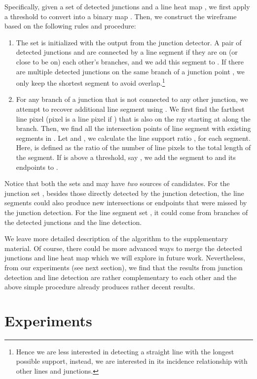 \documentclass[10pt,twocolumn,letterpaper]{article}
\begin{document}
Specifically, given a set of detected junctions  and a line heat map , we first apply a threshold  to convert  into a binary map . Then, we construct the wireframe based on the following rules and procedure:\vspace{-1mm}
\begin{enumerate}
\item The set  is initialized with the output from the junction detector. A pair of detected junctions  and  are connected by a line segment  if they are on (or close to be on) each other's branches, and we add this segment  to . If there are multiple detected junctions on the same branch of a junction point , we only keep the shortest segment to avoid overlap.\footnote{Hence we are less interested in detecting a straight line with the longest possible support, instead, we are interested in its incidence relationship with other lines and junctions.} \vspace{-1mm}
\item For any branch of a junction  that is not connected to any other junction, we attempt to recover additional line segment using . We first find the farthest line pixel  (pixel  is a line pixel if ) that is also on the ray starting at  along the branch. Then, we find all the intersection points  of line segment  with existing segments in . Let  and , we calculate the line support ratio , for each segment. Here,  is defined as the ratio of the number of line pixels to the total length of the segment. If  is above a threshold, say , we add the segment to  and its endpoints to .
\end{enumerate}
Notice that both the sets  and  may have {\em two} sources of candidates. For the junction set , besides those directly detected by the junction detection, the line segments could also produce new intersections or endpoints that were missed by the junction detection. For the line segment set ,  it could come from branches of the detected junctions and the line detection. 

We leave more detailed description of the algorithm to the supplementary material. Of course, there could be more advanced ways to merge the detected junctions and line heat map which we will explore in future work. Nevertheless, from our experiments (see next section), we find that the results from junction detection and line detection are rather complementary to each other and the above simple procedure already produces rather decent results. 
 \section{Experiments}
\end{document}
